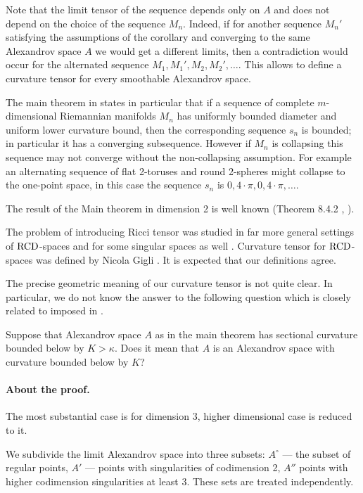 Note that the limit tensor of the sequence depends only on $A$ and does not depend on the choice of the sequence $M_n$.
Indeed, if for another sequence $M_n'$ satisfying the assumptions of the corollary and converging to the same Alexandrov space $A$ we would get a different limits, 
then a contradiction would occur for the alternated sequence $M_1,M_1',M_2,M_2',\dots$. This allows to define a curvature
tensor for every smoothable Alexandrov space. 

The main theorem in \cite{petrunin-SC} states in particular that if a sequence of complete $m$-dimensional Riemannian  manifolds $M_n$ has uniformly bounded diameter and uniform lower curvature bound, then 
the corresponding sequence $s_n$ is bounded; in particular it has a converging subsequence.
However if $M_n$ is collapsing this sequence may not converge
without the non-collapsing assumption.
For example an alternating sequence of flat 2-toruses and round 2-spheres might collapse to the one-point space, in this case the sequence $s_n$ is $0,4\cdot\pi,0,4\cdot\pi,\dots$.

The result of the Main theorem in dimension 2 is well
 known (Theorem 8.4.2 \cite{Resh}, \cite{AZ} ).

The problem of introducing Ricci tensor
was studied in far more general settings of 
 $\operatorname{RCD}$-spaces \cite{G1,St,H}
 and
for some singular  spaces as well \cite{L}.
Curvature tensor for  $\operatorname{RCD}$-spaces was defined by Nicola Gigli \cite{G}.
It is expected that our definitions agree.

The precise geometric meaning of our curvature tensor is not quite clear. 
In particular, we do not know the answer to the following question which is closely related to imposed in \cite[Conjecture~1.1]{G}.

Suppose that Alexandrov space $A$ as in the main theorem has sectional curvature bounded below by $K>\kappa$.
Does it mean that $A$ is an Alexandrov space with curvature bounded below by $K$?

\paragraph{About the proof.}
The most substantial case is for dimension $3$, higher dimensional case is reduced to it.

We subdivide the limit Alexandrov space into
three subsets: $A^\circ$ --- the subset of regular 
points, $A'$ --- points with singularities of codimension 2,
$A''$ points with higher codimension singularities at least 3.
These sets are treated independently.

